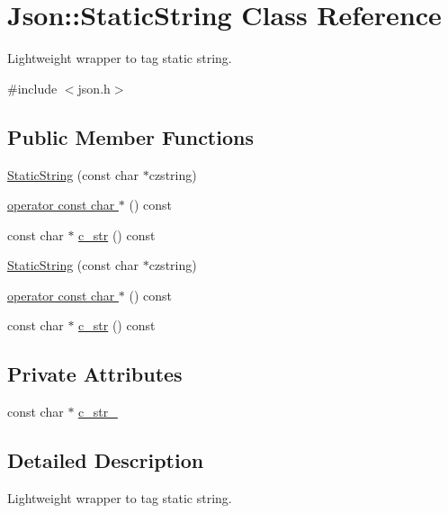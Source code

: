 \hypertarget{class_json_1_1_static_string}{}\section{Json\+:\+:Static\+String Class Reference}
\label{class_json_1_1_static_string}


Lightweight wrapper to tag static string.  




{\ttfamily \#include $<$json.\+h$>$}

\subsection*{Public Member Functions}
\begin{DoxyCompactItemize}
\item 
\hyperlink{class_json_1_1_static_string_afb6baf1ec078ce76f0b0f9b39d19437f}{Static\+String} (const char $\ast$czstring)
\item 
\hyperlink{class_json_1_1_static_string_a256a6cc0c630aef670848a0f11707b62}{operator const char $\ast$} () const
\item 
const char $\ast$ \hyperlink{class_json_1_1_static_string_ad6be703d432d108623bb0aa06b0b90ca}{c\+\_\+str} () const
\item 
\hyperlink{class_json_1_1_static_string_afb6baf1ec078ce76f0b0f9b39d19437f}{Static\+String} (const char $\ast$czstring)
\item 
\hyperlink{class_json_1_1_static_string_a256a6cc0c630aef670848a0f11707b62}{operator const char $\ast$} () const
\item 
const char $\ast$ \hyperlink{class_json_1_1_static_string_ad6be703d432d108623bb0aa06b0b90ca}{c\+\_\+str} () const
\end{DoxyCompactItemize}
\subsection*{Private Attributes}
\begin{DoxyCompactItemize}
\item 
const char $\ast$ \hyperlink{class_json_1_1_static_string_add9eec7693057fa981b4f0f454dc2aee}{c\+\_\+str\+\_\+}
\end{DoxyCompactItemize}


\subsection{Detailed Description}
Lightweight wrapper to tag static string. 

